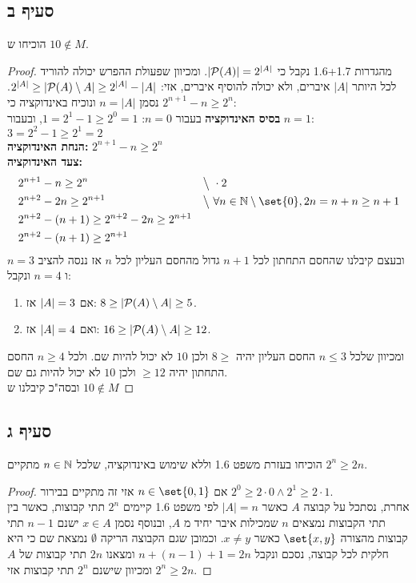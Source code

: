 \documentclass{article}
\DeclarePairedDelimiter\set\{\}
\begin{document}
	\subsection*{סעיף ב}
	הוכיחו ש $10 \not\in M$.
	\begin{proof}
		מהגדרות 1.6+1.7 נקבל כי $\left| \mathcal{P}(A) \right| = 2^{\left| A \right|}$.
		ומכיוון שפעולת ההפרש יכולה להוריד לכל היותר $|A|$ איברים, ולא יכולה להוסיף איברים, אזי:
		$2^{\left| A \right|} \geq \left| \mathcal{P}(A) \setminus A \right| \geq 2^{\left| A \right|} - \left| A \right|$.
		נסמן $n = |A|$ ונוכיח באינדוקציה כי $2^{n+1} - n \geq 2^{n}$: \\
		\textbf{בסיס האינדוקציה} בעבור $n = 0$: $1 = 2^1 - 1 \geq 2^0 = 1$, ובעבור $n = 1$: $3 = 2^2 - 1 \geq 2^1 = 2$ \\
		\textbf{הנחת האינדוקציה:} $2^{n+1} - n \geq 2^{n}$  \\
		\textbf{צעד האינדוקציה:}
		\begin{alignat*}{2}
			&2^{n+1} - n \geq 2^{n} &&\big\backslash \ \cdot 2 \\
			&2^{n+2} - 2n \geq 2^{n+1} &&\big\backslash \ \forall n \in \NN \sub \set{0},  2n = n + n \geq n+1 \\
			&2^{n+2} - (n+1) \geq 2^{n+2} - 2n \geq 2^{n+1} \\
			&2^{n+2} - (n+1) \geq 2^{n+1}
		\end{alignat*}
		ובעצם קיבלנו שהחסם התחתון לכל $n+1$ גדול מהחסם העליון לכל $n$
		אז ננסה להציב $n=3$ ו $n=4$ ונקבל:
		\begin{enumerate}
			\item אם $\left| A \right| = 3$ אז: $8 \geq \left| \mathcal{P}(A) \setminus A \right| \geq 5$.
			\item ואם $\left| A \right| = 4$ אז: $16 \geq \left| \mathcal{P}(A) \setminus A \right| \geq 12$.
		\end{enumerate}
		ומכיוון שלכל $n \leq 3$ החסם העליון יהיה $8 \geq$ ולכן $10$ לא יכול להיות שם.
		ולכל $n \geq 4$ החסם התחתון יהיה $\geq 12$ ולכן $10$ לא יכול להיות גם שם. \\
		ובסה"כ קיבלנו ש $10 \not\in M$
	\end{proof}
	\subsection*{סעיף ג}
	הוכיחו בעזרת משפט 1.6 וללא שימוש באינדוקציה, שלכל $n \in \mathbb{N}$ מתקיים $2^n \geq 2n$.
	\begin{proof}
		אם $n \in \set{0,1}$ אזי זה מתקיים בבירור $2^0 \geq 2 \cdot 0 \land 2^1 \geq 2 \cdot 1$. \\
		אחרת, נסתכל על קבוצה $A$ כאשר $|A| = n$ לפי משפט 1.6 קיימים $2^n$
		תתי קבוצות, כאשר בין תתי הקבוצות נמצאים $n$ שמכילות איבר יחיד מ $A$,
		 ובנוסף נסמן $x \in A$ ישנם $n-1$ תתי קבוצות מהצורה $\set{x, y}$ כאשר $x \neq y$.
		וכמובן שגם הקבוצה הריקה $\emptyset$ נמצאת שם כי היא חלקית לכל קבוצה, נסכם ונקבל $n + (n-1) + 1 = 2n$ ומצאנו $2n$ תתי קבוצות של $A$ ומכיוון שישנם $2^n$ תתי קבוצות אזי $2^n \geq 2n$.
	\end{proof}
\end{document}
